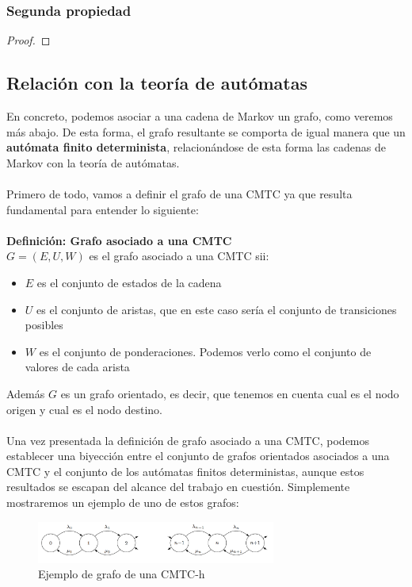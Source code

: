 \documentclass[12pt,a4paper]{article}
\begin{document}
\subsubsection{Segunda propiedad}
\begin{proof}

\end{proof}
\subsection{Relación con la teoría de autómatas}
En concreto, podemos asociar a una cadena de Markov un grafo, como veremos más abajo. De esta forma, el grafo resultante se comporta de igual manera que un \textbf{autómata finito determinista}, relacionándose de esta forma las cadenas de Markov con la teoría de autómatas.
\\\\
Primero de todo, vamos a definir el grafo de una CMTC ya que resulta fundamental para entender lo siguiente:
\\\\
\textbf{Definición: Grafo asociado a una CMTC}
\\
$G=(E,U,W)$ es el grafo asociado a una CMTC sii:
\begin{itemize}
\item $E$ es el conjunto de estados de la cadena
\item $U$ es el conjunto de aristas, que en este caso sería el conjunto de transiciones posibles
\item $W$ es el conjunto de ponderaciones. Podemos verlo como el conjunto de valores de cada arista
\end{itemize}
Además $G$ es un grafo orientado, es decir, que tenemos en cuenta cual es el nodo origen y cual es el nodo destino.
\\\\
Una vez presentada la definición de grafo asociado a una CMTC, podemos establecer una biyección entre el conjunto de grafos orientados asociados a una CMTC y el conjunto de los autómatas finitos deterministas, aunque estos resultados se escapan del alcance del trabajo en cuestión. Simplemente mostraremos un ejemplo de uno de estos grafos:
\\
\begin{figure}[h]
  \centering
    \includegraphics[width=0.7\textwidth]{img/grafo.png}
  \caption{Ejemplo de grafo de una CMTC-h}
  \label{fig:ejemplo}
\end{figure}
\end{document}
